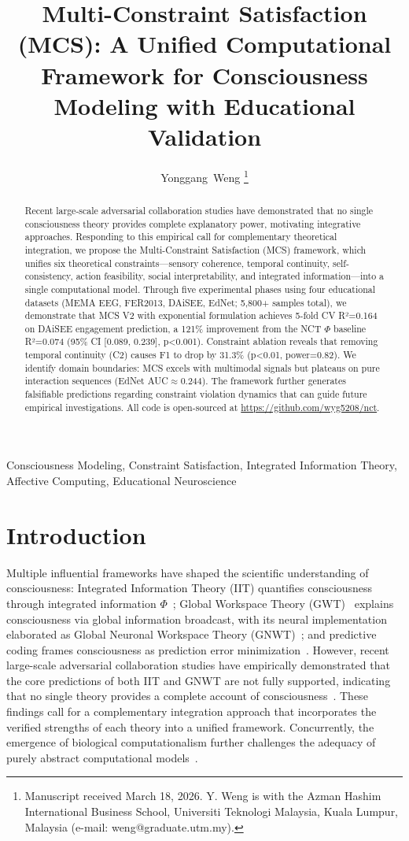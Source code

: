\documentclass[10pt,journal,compsoc]{IEEEtran}
\title{Multi-Constraint Satisfaction (MCS): A Unified Computational Framework for Consciousness Modeling with Educational Validation}
\author{Yonggang~Weng
\thanks{Manuscript received March 18, 2026. Y. Weng is with the Azman Hashim International Business School, Universiti Teknologi Malaysia, Kuala Lumpur, Malaysia (e-mail: weng@graduate.utm.my).}
}
\begin{document}
\maketitle

\begin{abstract}
Recent large-scale adversarial collaboration studies have demonstrated that no single consciousness theory provides complete explanatory power, motivating integrative approaches. Responding to this empirical call for complementary theoretical integration, we propose the Multi-Constraint Satisfaction (MCS) framework, which unifies six theoretical constraints—sensory coherence, temporal continuity, self-consistency, action feasibility, social interpretability, and integrated information—into a single computational model. Through five experimental phases using four educational datasets (MEMA EEG, FER2013, DAiSEE, EdNet; 5,800+ samples total), we demonstrate that MCS V2 with exponential formulation achieves 5-fold CV R²=0.164 on DAiSEE engagement prediction, a 121\% improvement from the NCT $\Phi$ baseline R²=0.074 (95\% CI [0.089, 0.239], p<0.001). Constraint ablation reveals that removing temporal continuity (C2) causes F1 to drop by 31.3\% (p<0.01, power=0.82). We identify domain boundaries: MCS excels with multimodal signals but plateaus on pure interaction sequences (EdNet AUC$\approx$0.244). The framework further generates falsifiable predictions regarding constraint violation dynamics that can guide future empirical investigations. All code is open-sourced at \url{https://github.com/wyg5208/nct}.
\end{abstract}

\begin{IEEEkeywords}
Consciousness Modeling, Constraint Satisfaction, Integrated Information Theory, Affective Computing, Educational Neuroscience
\end{IEEEkeywords}

\section{Introduction}
\label{sec:introduction}

Multiple influential frameworks have shaped the scientific understanding of consciousness: Integrated Information Theory (IIT) quantifies consciousness through integrated information $\Phi$~\cite{tononi2004,tononi2008,tononi2016}; Global Workspace Theory (GWT)~\cite{baars2005} explains consciousness via global information broadcast, with its neural implementation elaborated as Global Neuronal Workspace Theory (GNWT)~\cite{dehaene2014}; and predictive coding frames consciousness as prediction error minimization~\cite{friston2010}. However, recent large-scale adversarial collaboration studies have empirically demonstrated that the core predictions of both IIT and GNWT are not fully supported, indicating that no single theory provides a complete account of consciousness~\cite{Melloni2025,Storm2024}. These findings call for a complementary integration approach that incorporates the verified strengths of each theory into a unified framework. Concurrently, the emergence of biological computationalism further challenges the adequacy of purely abstract computational models~\cite{Milinkovic2025}.
\end{document}
